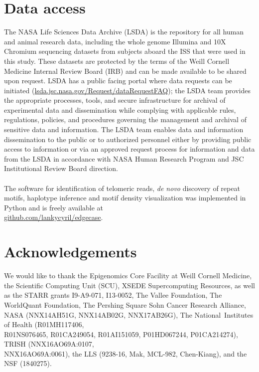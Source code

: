 \documentclass{article}
\begin{document}
\section*{Data access} 
The NASA Life Sciences Data Archive (LSDA) is the repository for all human and animal research data, including the whole genome Illumina and 10X Chromium sequencing datasets from subjects aboard the ISS that were used in this study.
These datasets are protected by the terms of the Weill Cornell Medicine Internal Review Board (IRB) and can be made available to be shared upon request.
LSDA has a public facing portal where data requests can be initiated (\href{https://lsda.jsc.nasa.gov/Request/dataRequestFAQ}{lsda.jsc.nasa.gov/Request/dataRequestFAQ});
the LSDA team provides the appropriate processes, tools, and secure infrastructure for archival of experimental data and dissemination while complying with applicable rules, regulations, policies, and procedures governing the management and archival of sensitive data and information.
The LSDA team enables data and information dissemination to the public or to authorized personnel either by providing public access to information or via an approved request process for information and data from the LSDA in accordance with NASA Human Research Program and JSC Institutional Review Board direction.
\\~\\
The software for identification of telomeric reads, \textit{de novo} discovery of repeat motifs, haplotype inference and motif density visualization was implemented in Python and is freely available at \\%
\href{https://github.com/lankycyril/edgecase}{github.com/lankycyril/edgecase}.

\section*{Acknowledgements} 
We would like to thank
the Epigenomics Core Facility at Weill Cornell Medicine,
the Scientific Computing Unit (SCU),
XSEDE Supercomputing Resources,
as well as
the STARR grants I9-A9-071, I13-0052,
The Vallee Foundation,
The WorldQuant Foundation,
The Pershing Square Sohn Cancer Research Alliance,
NASA (NNX14AH51G, NNX14AB02G, NNX17AB26G),
The National Institutes of Health (R01MH117406, \\%
R01NS076465, R01CA249054, R01AI151059, P01HD067244, P01CA214274),
TRISH (NNX16AO69A:0107, \\%
NNX16AO69A:0061),
the LLS (9238-16, Mak, MCL-982, Chen-Kiang),
and
the NSF (1840275).
\end{document}
